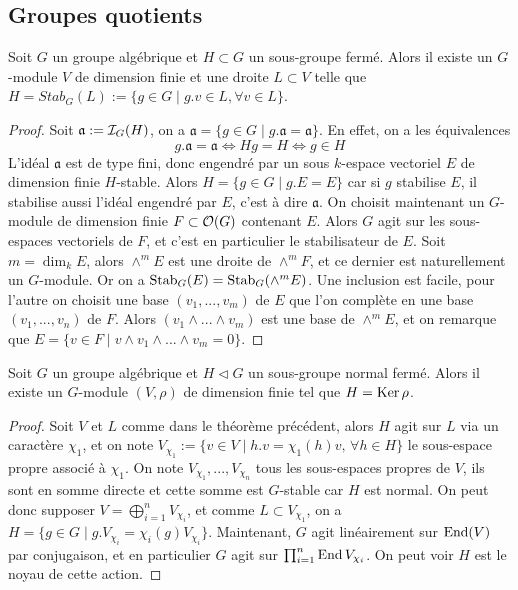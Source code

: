 \subsection{Groupes quotients}
\begin{thm}[Chevalley]
Soit $G$ un groupe algébrique et $H\subset G$ un sous-groupe fermé. Alors il existe un $G$-module $V$ de dimension finie et une droite $L\subset V$ telle que $H=Stab_G(L):=\lbrace g\in G\mid g.v\in L,\forall v\in L\rbrace$.
\end{thm}
\begin{proof}
Soit $\mathfrak{a}:=\mathcal{I}_G(H)$, on a  $\mathfrak{a}=\lbrace g\in G\mid g.\mathfrak{a}=\mathfrak{a}\rbrace$. En effet, on a les équivalences
$$g.\mathfrak{a}=\mathfrak{a}\iff Hg=H\iff g\in H$$
L'idéal $\mathfrak{a}$ est de type fini, donc engendré par un sous $k$-espace vectoriel $E$ de dimension finie $H$-stable. Alors $H=\lbrace g\in G\mid g.E=E\rbrace$ car si $g$ stabilise $E$, il stabilise aussi l'idéal engendré par $E$, c'est à dire $\mathfrak{a}$. On choisit maintenant un $G$-module de dimension finie $F\subset \mathcal{O}(G)$ contenant $E$. Alors $G$ agit sur les sous-espaces vectoriels de $F$, et c'est en particulier le stabilisateur de $E$. Soit $m=\dim_k E$, alors $\wedge^mE$ est une droite de $\wedge^mF$, et ce dernier est naturellement un $G$-module. Or on a $\operatorname{Stab}_G(E)=\operatorname{Stab}_G(\wedge^mE)$. Une inclusion est facile, pour l'autre on choisit une base $(v_1,...,v_m)$ de $E$ que l'on complète en une base $(v_1,...,v_n)$ de $F$. Alors $(v_1\wedge...\wedge v_m)$ est une base de $\wedge^mE$, et on remarque que $E=\lbrace v\in F\mid v\wedge v_1\wedge...\wedge v_m=0\rbrace$.
\end{proof}


\begin{thm}[Chevalley]
Soit $G$ un groupe algébrique et $H\lhd G$ un sous-groupe normal fermé. Alors il existe un $G$-module $(V, \rho)$ de dimension finie tel que $H=\operatorname{Ker}{\rho}$.
\end{thm}
\begin{proof}
Soit $V$ et $L$ comme dans le théorème précédent, alors $H$ agit sur $L$ via un caractère $\chi_1$, et on note $V_{\chi_1}:=\lbrace v\in V\mid h.v=\chi_1(h)v,\, \forall h\in H\rbrace$ le sous-espace propre associé à $\chi_1$. On note $V_{\chi_1},...,V_{\chi_n}$ tous les sous-espaces propres de $V$, ils sont en somme directe et cette somme est $G$-stable car $H$ est normal. On peut donc supposer $V=\bigoplus_{i=1}^nV_{\chi_i}$, et comme $L\subset V_{\chi_1}$, on a $H=\lbrace g\in G\mid g.V_{\chi_i}=\chi_i(g)V_{\chi_i}\rbrace$. Maintenant, $G$ agit linéairement sur $\operatorname{End}(V)$ par conjugaison, et en particulier $G$ agit sur $\prod_{i=1}^n\operatorname{End} V_{\chi_i}$. On peut voir $H$ est le noyau de cette action.
\end{proof}

